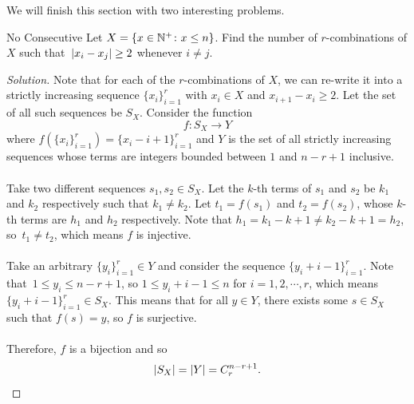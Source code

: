 \documentclass[math]{amznotes}
\theoremstyle{remark}
\newcommand{\0}{\mathbf{0}}
\newcommand{\1}{\mathbf{1}}
\newenvironment{solution}
    {\let\oldqedsymbol=\qedsymbol
    \renewcommand{\qedsymbol}{\ }
    \begin{proof}[Solution]
    }
    {\end{proof}
    \renewcommand{\qedsymbol}{\oldqedsymbol}
    }
\begin{document}
We will finish this section with two interesting problems.
\begin{exbox}{No Consecutive}{}
    Let $X = \left\{x \in \mathbb{N}^+ \colon x \leq n\right\}$. Find the number of $r$-combinations of $X$ such that~${\left\lvert {x_i - x_j} \right\rvert} \geq 2$ whenever $i \neq j$.
    \tcblower   
    \begin{solution}
        Note that for each of the $r$-combinations of $X$, we can re-write it into a strictly increasing sequence $\{x_i\}_{i = 1}^r$ with $x_i \in X$ and $x_{i + 1} - x_i \geq 2$. Let the set of all such sequences be $S_X$. Consider the function
        \begin{displaymath}
            f \colon S_X \to Y
        \end{displaymath}
        where $f\left(\{x_i\}_{i = 1}^r\right) = \{x_i - i + 1\}_{i = 1}^r$ and $Y$ is the set of all strictly increasing sequences whose terms are integers bounded between $1$ and $n - r + 1$ inclusive.
        \\\\
        Take two different sequences $s_1, s_2 \in S_X$. Let the $k$-th terms of $s_1$ and $s_2$ be $k_1$ and $k_2$ respectively such that $k_1 \neq k_2$. Let $t_1 = f(s_1)$ and $t_2 = f(s_2)$, whose $k$-th terms are $h_1$ and $h_2$ respectively. Note that $h_1 = k_1 - k + 1 \neq k_2 - k + 1 = h_2$, so~$t_1 \neq t_2$, which means $f$ is injective.
        \\\\
        Take an arbitrary $\{y_i\}_{i = 1}^r \in Y$ and consider the sequence $\{y_i + i - 1\}_{i = 1}^r$. Note that~$1 \leq y_i \leq n - r + 1$, so $1 \leq y_i + i - 1 \leq n$ for $i = 1, 2, \cdots, r$, which means~$\{y_i + i - 1\}_{i = 1}^r \in S_X$. This means that for all $y \in Y$, there exists some $s \in S_X$ such that $f(s) = y$, so $f$ is surjective.
        \\\\
        Therefore, $f$ is a bijection and so
        \begin{equation*}
            {\left\lvert {S_X} \right\rvert} = {\left\lvert {Y} \right\rvert} = C^{n - r + 1}_r.
        \end{equation*}
    \end{solution}
\end{exbox}
\end{document}
